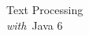 \clearpage
\pagestyle{empty}
\cleardoublepage
\vspace*{1.75in}
\begin{center}
{\hfill \Huge Text Processing \\[4pt] \hfill {\LARGE\it with}\ Java 6}
\end{center}
